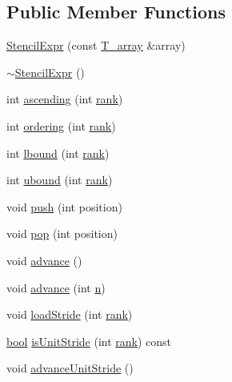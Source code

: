 \subsection*{Public Member Functions}
\begin{DoxyCompactItemize}
\item 
\hyperlink{classStencilExpr_a7b661d5d9037e03567d39074c08da91a}{Stencil\+Expr} (const \hyperlink{classStencilExpr_a9a5d9a852bd72220519a7042927dc7c1}{T\+\_\+array} \&array)
\item 
\hyperlink{classStencilExpr_a1d361103dde9fd44b0a9306a1dc1b47b}{$\sim$\+Stencil\+Expr} ()
\item 
int \hyperlink{classStencilExpr_a30503a767a874a0d7dd1f713c008578f}{ascending} (int \hyperlink{classStencilExpr_ad3f5edc99b864f011b2d88bce7ac3b48}{rank})
\item 
int \hyperlink{classStencilExpr_aef96ae4298abf4d27f0f5265770205e9}{ordering} (int \hyperlink{classStencilExpr_ad3f5edc99b864f011b2d88bce7ac3b48}{rank})
\item 
int \hyperlink{classStencilExpr_a9d3e50da212bc47970f8fcd66217ec78}{lbound} (int \hyperlink{classStencilExpr_ad3f5edc99b864f011b2d88bce7ac3b48}{rank})
\item 
int \hyperlink{classStencilExpr_ac95e6f8f93129841499781f3bf52bd56}{ubound} (int \hyperlink{classStencilExpr_ad3f5edc99b864f011b2d88bce7ac3b48}{rank})
\item 
void \hyperlink{classStencilExpr_a2c7415fb6470c96ab88c29710569b002}{push} (int position)
\item 
void \hyperlink{classStencilExpr_aa8308ac967f2cd028e599f7529d92b2f}{pop} (int position)
\item 
void \hyperlink{classStencilExpr_af5c83fc99f0293bba8a86ca14f17bfa7}{advance} ()
\item 
void \hyperlink{classStencilExpr_a28c15d9ff91b1ad981d40616611b9015}{advance} (int \hyperlink{indexexpr_8h_ab427e2e2b4d6cec55fa088ea2a692ace}{n})
\item 
void \hyperlink{classStencilExpr_a222b76af17dff7b09d7bf2695a436404}{load\+Stride} (int \hyperlink{classStencilExpr_ad3f5edc99b864f011b2d88bce7ac3b48}{rank})
\item 
\hyperlink{compiler_8h_abb452686968e48b67397da5f97445f5b}{bool} \hyperlink{classStencilExpr_a47a68cb18030dc0064e48b920a4c1a41}{is\+Unit\+Stride} (int \hyperlink{classStencilExpr_ad3f5edc99b864f011b2d88bce7ac3b48}{rank}) const 
\item 
void \hyperlink{classStencilExpr_a1eb7c3b0d906513d12c14a4c0c8978bc}{advance\+Unit\+Stride} ()

\end{DoxyCompactItemize}

